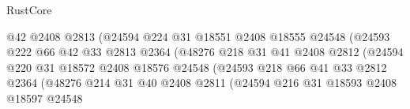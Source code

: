 \begin{lexlean}{RustCore}
\begin{coremodule}
                                        @42
                                        @2408
                                        @2813
                                        (@24594
                                          @224
                                          @31
                                          @18551
                                          @2408
                                          @18555
                                          @24548
                                          (@24593
                                            @222
                                            @66
                                            @42
                                            @33
                                            @2813
                                            @2364
                                            (@48276
                                              @218
                                              @31
                                              @41
                                              @2408
                                              @2812
                                              (@24594
                                                @220
                                                @31
                                                @18572
                                                @2408
                                                @18576
                                                @24548
                                                (@24593
                                                  @218
                                                  @66
                                                  @41
                                                  @33
                                                  @2812
                                                  @2364
                                                  (@48276
                                                    @214
                                                    @31
                                                    @40
                                                    @2408
                                                    @2811
                                                    (@24594
                                                      @216
                                                      @31
                                                      @18593
                                                      @2408
                                                      @18597
                                                      @24548

\end{coremodule}
\end{lexlean}
